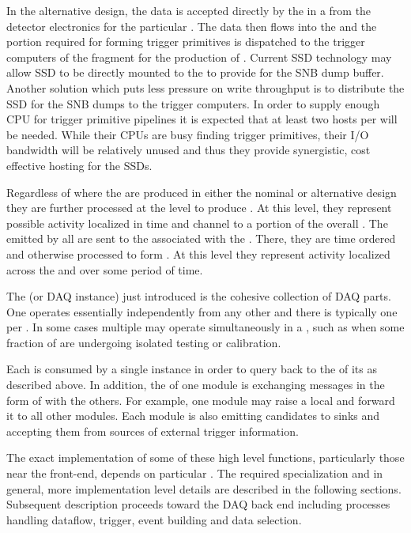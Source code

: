 In the alternative design, the data is accepted directly by the
 in a  from the detector electronics
for the particular .
The data then flows into the  and the portion required
for forming trigger primitives is dispatched to the trigger computers
of the fragment for the production of .
Current SSD technology may allow SSD to be directly mounted to the
 to provide for the SNB dump buffer. 
Another solution which puts less pressure on write throughput is to
distribute the SSD for the SNB dumps to the trigger computers. 
In order to supply enough CPU for trigger primitive pipelines it is
expected that at least two hosts per  will be needed.
While their CPUs are busy finding trigger primitives, their I/O
bandwidth will be relatively unused and thus they provide synergistic,
cost effective hosting for the SSDs.

Regardless of where the  are produced in either
the nominal or alternative design they are further processed at the
 level to produce . 
At this level, they represent possible activity localized in time and
channel to a portion of the overall .
The  emitted by all  are sent to
the  associated with the .
There, they are time ordered and otherwise processed to form
.
At this level they represent activity localized across the
 and over some period of time.

The  (or DAQ instance) just introduced is the cohesive
collection of DAQ parts. 
One  operates essentially independently from any other
and there is typically one per . 
In some cases multiple  may operate simultaneously in
a , such as when some fraction of 
are undergoing isolated testing or calibration.

Each  is consumed by a single  instance
in order to query back to the  of its 
as described above.
In addition, the  of one module is exchanging messages in
the form of  with the others. 
For example, one module may raise a local 
 and forward it to all other modules.
Each module is also emitting candidates to sinks and accepting them
from sources of external trigger information.

The exact implementation of some of these high level functions,
particularly those near the front-end, depends on particular
. 
The required specialization and in general, more implementation level
details are described in the following sections.
Subsequent description proceeds toward the DAQ back end including
processes handling dataflow, trigger, event building and data
selection.

